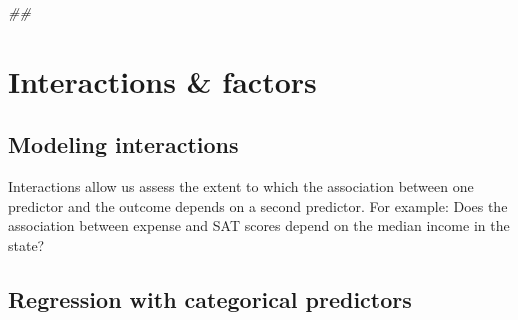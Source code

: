 \documentclass[
]{book}
\newenvironment{Shaded}{\begin{snugshade}}{\end{snugshade}}
\newcommand{\CommentTok}[1]{\textcolor[rgb]{0.56,0.35,0.01}{\textit{#1}}}
\newcommand{\DataTypeTok}[1]{\textcolor[rgb]{0.13,0.29,0.53}{#1}}
\newcommand{\DecValTok}[1]{\textcolor[rgb]{0.00,0.00,0.81}{#1}}
\newcommand{\KeywordTok}[1]{\textcolor[rgb]{0.13,0.29,0.53}{\textbf{#1}}}
\newcommand{\NormalTok}[1]{#1}
\newcommand{\OperatorTok}[1]{\textcolor[rgb]{0.81,0.36,0.00}{\textbf{#1}}}
\newcommand{\StringTok}[1]{\textcolor[rgb]{0.31,0.60,0.02}{#1}}
\begin{document}
\begin{Shaded}
\begin{Highlighting}[]
\CommentTok{## }
\end{Highlighting}
\end{Shaded}

\hypertarget{interactions-factors}{%
\section{Interactions \& factors}\label{interactions-factors}}

\hypertarget{modeling-interactions}{%
\subsection{Modeling interactions}\label{modeling-interactions}}

Interactions allow us assess the extent to which the association between one predictor and the outcome depends on a second predictor. For example: Does the association between expense and SAT scores depend on the median income in the state?

\begin{Shaded}
\end{Shaded}

\hypertarget{regression-with-categorical-predictors}{%
\subsection{Regression with categorical predictors}\label{regression-with-categorical-predictors}}
\end{document}
